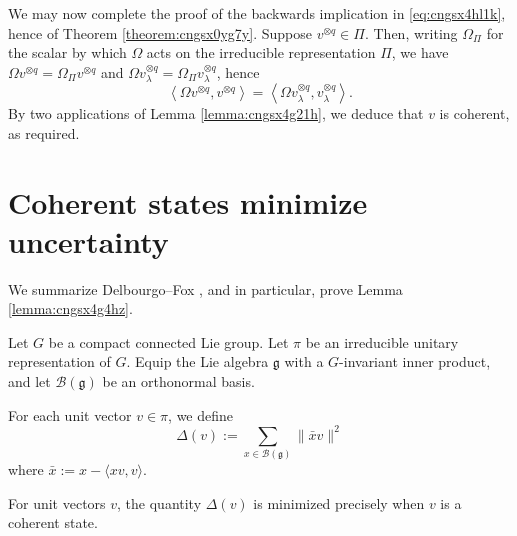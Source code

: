 \documentclass[reqno]{amsart} 
\begin{document}
We may now complete the proof of the backwards implication in \eqref{eq:cngsx4hl1k}, hence of Theorem \ref{theorem:cngsx0yg7y}.  Suppose $v^{\otimes q} \in \Pi$.  Then, writing $\Omega_\Pi$ for the scalar by which $\Omega$ acts on the irreducible representation $\Pi$, we have $\Omega v^{\otimes q} = \Omega_\Pi v^{\otimes q}$ and $\Omega v_\lambda^{\otimes q} = \Omega_\Pi v_\lambda^{\otimes q}$, hence
\begin{equation*}
  \left\langle \Omega v^{\otimes q}, v^{\otimes q} \right\rangle
  =
  \left\langle \Omega v_\lambda^{\otimes q}, v_\lambda^{\otimes q} \right\rangle.
\end{equation*}
By two applications of Lemma \ref{lemma:cngsx4g21h}, we deduce that $v$ is coherent, as required.


\section{Coherent states minimize uncertainty}\label{sec:cngsx6buyy}
We summarize Delbourgo--Fox \cite{MR0480888}, and in particular, prove Lemma \ref{lemma:cngsx4g4hz}.

Let $G$ be a compact connected Lie group.  Let $\pi$ be an irreducible unitary representation of $G$.  Equip the Lie algebra $\mathfrak{g}$ with a $G$-invariant inner product, and let $\mathcal{B}(\mathfrak{g})$ be an orthonormal basis.

\begin{definition}\label{definition:cngsx6dtkh}
  For each unit vector $v \in \pi$, we define
  \begin{equation*}
    \Delta(v) := \sum_{
      x \in \mathcal{B}(\mathfrak{g})      
    }
    \lVert \bar{x} v \rVert^2
  \end{equation*}
  where $\bar{x} := x - \langle x v, v \rangle$.
\end{definition}
\begin{theorem}\label{theorem:cngsx6du1v}
  For unit vectors $v$, the quantity $\Delta(v)$ is minimized precisely when $v$ is a coherent state.
\end{theorem}
\end{document}
